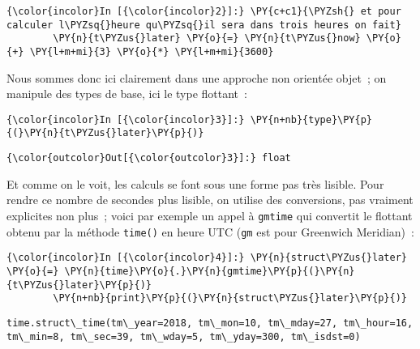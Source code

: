     \begin{Verbatim}[commandchars=\\\{\},frame=single,framerule=0.3mm,rulecolor=\color{cellframecolor}]
{\color{incolor}In [{\color{incolor}2}]:} \PY{c+c1}{\PYZsh{} et pour calculer l\PYZsq{}heure qu\PYZsq{}il sera dans trois heures on fait}
        \PY{n}{t\PYZus{}later} \PY{o}{=} \PY{n}{t\PYZus{}now} \PY{o}{+} \PY{l+m+mi}{3} \PY{o}{*} \PY{l+m+mi}{3600}
\end{Verbatim}


    Nous sommes donc ici clairement dans une approche non orientée objet~;
on manipule des types de base, ici le type flottant~:

    \begin{Verbatim}[commandchars=\\\{\},frame=single,framerule=0.3mm,rulecolor=\color{cellframecolor}]
{\color{incolor}In [{\color{incolor}3}]:} \PY{n+nb}{type}\PY{p}{(}\PY{n}{t\PYZus{}later}\PY{p}{)}
\end{Verbatim}


\begin{Verbatim}[commandchars=\\\{\},frame=single,framerule=0.3mm,rulecolor=\color{cellframecolor}]
{\color{outcolor}Out[{\color{outcolor}3}]:} float
\end{Verbatim}
            
    Et comme on le voit, les calculs se font sous une forme pas très
lisible. Pour rendre ce nombre de secondes plus lisible, on utilise des
conversions, pas vraiment explicites non plus~; voici par exemple un
appel à \texttt{gmtime} qui convertit le flottant obtenu par la méthode
\texttt{time()} en heure UTC (\texttt{gm} est pour Greenwich Meridian)~:

    \begin{Verbatim}[commandchars=\\\{\},frame=single,framerule=0.3mm,rulecolor=\color{cellframecolor}]
{\color{incolor}In [{\color{incolor}4}]:} \PY{n}{struct\PYZus{}later} \PY{o}{=} \PY{n}{time}\PY{o}{.}\PY{n}{gmtime}\PY{p}{(}\PY{n}{t\PYZus{}later}\PY{p}{)}
        \PY{n+nb}{print}\PY{p}{(}\PY{n}{struct\PYZus{}later}\PY{p}{)}
\end{Verbatim}


    \begin{Verbatim}[commandchars=\\\{\},frame=single,framerule=0.3mm,rulecolor=\color{cellframecolor}]
time.struct\_time(tm\_year=2018, tm\_mon=10, tm\_mday=27, tm\_hour=16, tm\_min=8, tm\_sec=39, tm\_wday=5, tm\_yday=300, tm\_isdst=0)
\end{Verbatim}

